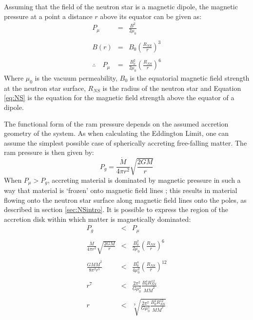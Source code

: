 \par Assuming that the field of the neutron star is a magnetic dipole, the magnetic pressure at a point a distance $r$ above its equator can be given as:
\begin{eqnarray}
P_\mu&=&\frac{B^2}{2\mu_0}\\ \nonumber \\
B(r)&=&B_0\left(\frac{R_{NS}}{r}\right)^3\label{eq:NS}\\ \nonumber \\
\therefore\quad P_\mu&=&\frac{B_0^2}{2\mu_0}\left(\frac{R_{NS}}{r}\right)^6
\end{eqnarray}
Where $\mu_0$ is the vacuum permeability, $B_0$ is the equatorial magnetic field strength at the neutron star surface, $R_{NS}$ is the radius of the neutron star and Equation \ref{eq:NS} is the equation for the magnetic field strength above the equator of a dipole.
\par The functional form of the ram pressure depends on the assumed accretion geometry of the system.  As when calculating the Eddington Limit, one can assume the simplest possible case of spherically accreting free-falling matter.  The ram pressure is then given by:
\begin{equation}
P_g=\frac{\dot{M}}{4\pi r^2}\sqrt{\frac{2GM}{r}}
\end{equation}
When $P_\mu>P_g$, accreting material is dominated by magnetic pressure in such a way that material is `frozen' onto magnetic field lines \citep{Alfven_Waves}; this results in material flowing onto the neutron star surface along magnetic field lines onto the poles, as described in section \ref{sec:NSintro}.  It is possible to express the region of the accretion disk within which matter is magnetically dominated:
\begin{eqnarray}
P_g&<&P_\mu\\ \nonumber \\
\frac{\dot{M}}{4\pi r^2}\sqrt{\frac{2GM}{r}}&<&\frac{B_0^2}{2\mu_0}\left(\frac{R_{NS}}{r}\right)^6\\ \nonumber \\
\frac{GM\dot{M}^2}{8\pi^2 r^5}&<&\frac{B_0^4}{4\mu_0^2}\left(\frac{R_{NS}}{r}\right)^{12}\\ \nonumber \\
r^7&<&\frac{2\pi^2}{G\mu_0^2}\frac{B_0^4R_{NS}^{12}}{M\dot{M}^2}\\ \nonumber \\
r&<&\sqrt[7]{\frac{2\pi^2}{G\mu_0^2}\frac{B_0^4R_{NS}^{12}}{M\dot{M}^2}}
\end{eqnarray}

